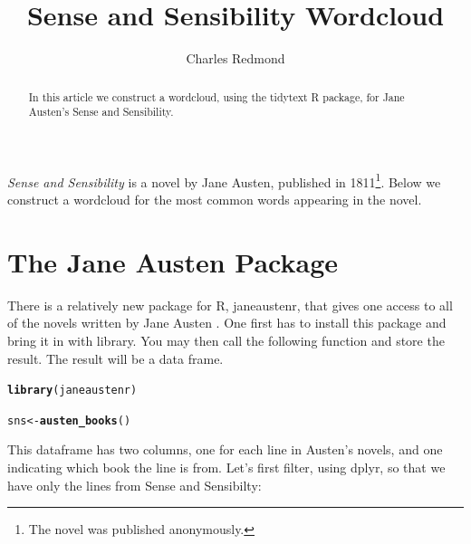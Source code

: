 \documentclass{article}\usepackage[]{graphicx}\usepackage[]{color}
\makeatletter
\newcommand{\hlstd}[1]{\textcolor[rgb]{0.345,0.345,0.345}{#1}}%
\newcommand{\hlkwb}[1]{\textcolor[rgb]{0.69,0.353,0.396}{#1}}%
\newcommand{\hlkwd}[1]{\textcolor[rgb]{0.737,0.353,0.396}{\textbf{#1}}}%
\newenvironment{kframe}{%
 \def\at@end@of@kframe{}%
 \ifinner\ifhmode%
  \def\at@end@of@kframe{\end{minipage}}%
  \begin{minipage}{\columnwidth}%
 \fi\fi%
 \def\FrameCommand##1{\hskip\@totalleftmargin \hskip-\fboxsep
 \colorbox{shadecolor}{##1}\hskip-\fboxsep
     \hskip-\linewidth \hskip-\@totalleftmargin \hskip\columnwidth}%
 \MakeFramed {\advance\hsize-\width
   \@totalleftmargin\z@ \linewidth\hsize
   \@setminipage}}%
 {\par\unskip\endMakeFramed%
 \at@end@of@kframe}
\newenvironment{knitrout}{}{} %
\makeatother
\begin{document}
\title{Sense and Sensibility Wordcloud}
\author{Charles Redmond}
\maketitle

\begin{abstract}
In this article we construct a wordcloud, using the tidytext R package, for Jane Austen's Sense and Sensibility.

\end{abstract}

\textit{Sense and Sensibility} is a novel by Jane Austen, published in 1811\footnote{The novel was published anonymously.}. Below we construct a wordcloud for the most common words appearing in the novel.

\section{The Jane Austen Package}
There is a relatively new package for R, janeaustenr, that gives one access to all of the novels written by Jane Austen \citep{Silge}.  One first has to install this package and bring it in with library.  You may then call the following function and store the result.  The result will be a data frame.

\begin{knitrout}
\color{fgcolor}\begin{kframe}
\begin{alltt}
\hlkwd{library}\hlstd{(janeaustenr)}
\end{alltt}


{\ttfamily\noindent\color{warningcolor}{\#\# Warning: package 'janeaustenr' was built under R version 3.4.2}}\begin{alltt}
\hlstd{sns}\hlkwb{<-}\hlkwd{austen_books}\hlstd{()}
\end{alltt}
\end{kframe}
\end{knitrout}

This dataframe has two columns, one for each line in Austen's novels, and one indicating which book the line is from.  Let's first filter, using dplyr, so that we have only the lines from Sense and Sensibilty:
\end{document}
